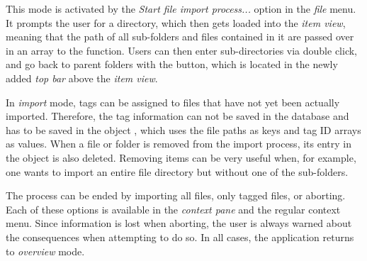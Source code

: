 This mode is activated by the \emph{Start file import process...} option in the \emph{file} menu. It prompts the user for a directory, which then gets loaded into the \emph{item view}, meaning that the path of all sub-folders and files contained in it are passed over in an array to the  function. Users can then enter sub-directories via double click, and go back to parent folders with the \tfcode{^} button, which is located in the newly added \emph{top bar} above the \emph{item view}.

In \emph{import} mode, tags can be assigned to files that have not yet been actually imported. Therefore, the tag information can not be saved in the database and has to be saved in the object , which uses the file paths as keys and tag ID arrays as values. When a file or folder is removed from the import process, its entry in the object is also deleted. Removing items can be very useful when, for example, one wants to import an entire file directory but without one of the sub-folders.

The process can be ended by importing all files, only tagged files, or aborting. Each of these options is available in the \emph{context pane} and the regular context menu. Since information is lost when aborting, the user is always warned about the consequences when attempting to do so. In all cases, the application returns to \emph{overview} mode.

